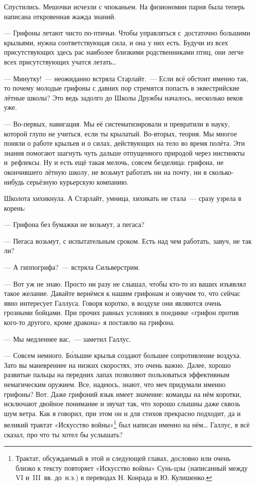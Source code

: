 \documentclass[fontsize=11pt,a5paper,titlepage=firstcover]{scrbook}
\begin{document}
Спустились. Мешочки исчезли с чпоканьем. На физиономии парня была теперь написана откровенная жажда знаний.

--- Грифоны летают чисто по-птичьи. Чтобы управляться с~достаточно большими крыльями, нужна соответствующая сила, и она у них есть. Будучи из всех присутствующих здесь рас наиболее близкими родственниками птиц, они легче всех присутствующих учатся летать{\ldots}

--- Минутку!~--- неожиданно встряла Старлайт.~--- Если всё обстоит именно так, то почему молодые грифоны с давних пор стремятся попасть в эквестрийские лётные школы? Это ведь задолго до Школы Дружбы началось, несколько веков уже.

--- Во-первых, навигация. Мы её систематизировали и превратили в науку, которой глупо не учиться, если ты крылатый. Во-вторых, теория. Мы многое поняли о работе крыльев и о силах, действующих на тело во время полёта. Эти знания помогают шагнуть чуть дальше отпущенного природой через инстинкты и~рефлексы. Ну и есть ещё такая мелочь, совсем безделица: грифона, не окончившего лётную школу, не возьмут работать ни на почту, ни в сколько-нибудь серьёзную курьерскую компанию.

Школота хихикнула. А Старлайт, умница, хихикать не стала~--- сразу узрела в корень:

--- Грифона без бумажки не возьмут, а пегаса?

--- Пегаса возьмут, с испытательным сроком. Есть над чем работать, завуч, не так ли?

--- А гиппогрифа?~--- встряла Сильверстрим.

--- Вот уж не знаю. Просто ни разу не слышал, чтобы кто-то из ваших изъявлял такое желание. Давайте вернёмся к нашим грифонам и озвучим то, что сейчас явно интересует Галлуса. Говоря коротко, в воздухе они являются очень грозными бойцами. При прочих равных условиях в поединке «грифон против кого-то другого, кроме дракона» я поставлю на грифона.

--- Мы медленнее вас,~--- заметил Галлус.

--- Совсем немного. Бо́льшие крылья создают большее сопротивление воздуха. Зато вы маневреннее на низких скоростях, это очень важно. Далее, хорошо развитые пальцы на передних лапах позволяют пользоваться эффективным немагическим оружием. Все, надеюсь, знают, что меч придумали именно грифоны? Вот. Даже грифоний язык имеет значение: команды на нём коротки, исключают двойное понимание и звучат так, что хорошо слышны даже сквозь шум ветра. Как я говорил, при этом он и для стихов прекрасно подходит, да и великий трактат «Искусство войны»\footnote{Трактат, обсуждаемый в этой и следующей главах, дословно или очень близко к тексту повторяет «Искусство войны» Сунь-цзы (написанный между VI и~III~вв. до~н.э.) в переводах Н. Конрада и Ю. Кулишенко.} был написан именно на нём{\ldots} Галлус, я всё сказал, про что ты хотел бы услышать?
\end{document}
